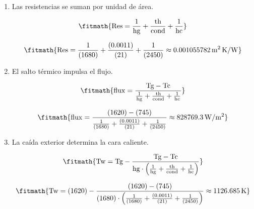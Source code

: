 \begin{enumerate}

\item Las resistencias se suman por unidad de área.

\[\fitmath{\mathrm{Res}=\frac{1}{\mathrm{hg}}+\frac{\mathrm{th}}{\mathrm{cond}}+\frac{1}{\mathrm{hc}}}\]

\[\fitmath{\mathrm{Res}=\frac{1}{(1680)}+\frac{(0.0011)}{(21)}+\frac{1}{(2450)}\approx 0.001055782\,\mathrm{m^{2}\,K/W}}\]

\item El salto térmico impulsa el flujo.

\[\fitmath{\mathrm{flux}=\frac{\mathrm{Tg}-\mathrm{Tc}}{\frac{1}{\mathrm{hg}}+\frac{\mathrm{th}}{\mathrm{cond}}+\frac{1}{\mathrm{hc}}}}\]

\[\fitmath{\mathrm{flux}=\frac{(1620)-(745)}{\frac{1}{(1680)}+\frac{(0.0011)}{(21)}+\frac{1}{(2450)}}\approx 828769.3\,\mathrm{W/m^{2}}}\]

\item La caída exterior determina la cara caliente.

\[\fitmath{\mathrm{Tw}=\mathrm{Tg}-\frac{\mathrm{Tg}-\mathrm{Tc}}{\mathrm{hg}\cdot \left(\frac{1}{\mathrm{hg}}+\frac{\mathrm{th}}{\mathrm{cond}}+\frac{1}{\mathrm{hc}}\right)}}\]

\[\fitmath{\mathrm{Tw}=(1620)-\frac{(1620)-(745)}{(1680)\cdot \left(\frac{1}{(1680)}+\frac{(0.0011)}{(21)}+\frac{1}{(2450)}\right)}\approx 1126.685\,\mathrm{K}}\]

\end{enumerate}
